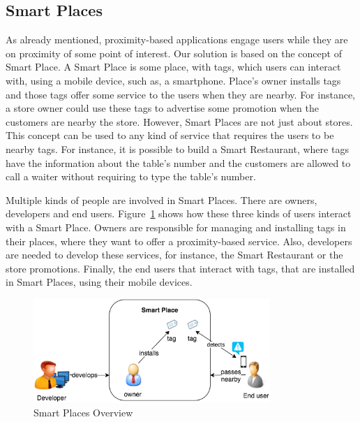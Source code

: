 \subsection{Smart Places}
\label{sec:background_smart_places}
As already mentioned, proximity-based applications engage users while they are on proximity of some point of interest.
Our solution is based on the concept of Smart Place.
A Smart Place is some place, with tags, which users can interact with, using a mobile device, such as, a smartphone.
Place's owner installs tags and those tags offer some service to the users when they are nearby.
For instance, a store owner could use these tags to advertise some promotion when the customers are nearby the store.
However, Smart Places are not just about stores.
This concept can be used to any kind of service that requires the users to be nearby tags.
For instance, it is possible to build a Smart Restaurant, where tags have the information about the table's number and the customers are allowed to call a waiter without requiring to type the table's number.

Multiple kinds of people are involved in Smart Places.
There are owners, developers and end users.
Figure~\ref{fig:smart_places_overview} shows how these three kinds of users interact with a Smart Place.
Owners are responsible for managing and installing tags in their places, where they want to offer a proximity-based service.
Also, developers are needed to develop these services, for instance, the Smart Restaurant or the store promotions.
Finally, the end users that interact with tags, that are installed in Smart Places, using their mobile devices.

\begin{figure}[!ht]
  \centering
    \includegraphics[width=0.8\textwidth, keepaspectratio]{figures/smart_places_overview}
    \caption[Smart Places Overview]{Smart Places Overview}
    \label{fig:smart_places_overview}
\end{figure}

